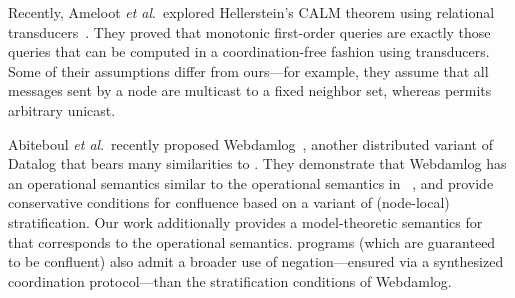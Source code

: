 Recently, Ameloot \emph{et al}.\ explored Hellerstein's CALM theorem using
relational transducers~\cite{relational-transducers}.  They proved that
monotonic first-order queries are exactly those queries that can be
computed in a coordination-free fashion using transducers.  Some of their
assumptions differ from ours---for example, they assume that
all messages sent by a node are multicast to a fixed neighbor set, whereas
\lang permits arbitrary unicast. 

Abiteboul \emph{et al}.\ recently proposed Webdamlog~\cite{Abiteboul2011}, another distributed variant of
Datalog that bears many similarities to \lang.  They demonstrate that Webdamlog has an
operational semantics similar to the operational semantics in \lang~\cite{ameloot-operational},
and provide conservative conditions for confluence based on a variant of (node-local) stratification.
Our work additionally provides a model-theoretic semantics for \plang that corresponds to the operational semantics.  
\plang programs (which are guaranteed to be confluent) 
also admit a broader use of negation---ensured via a synthesized
coordination protocol---than the stratification conditions of Webdamlog.

